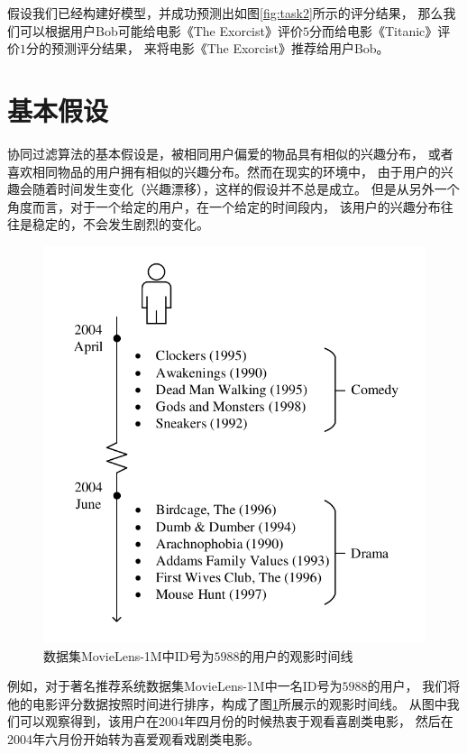 假设我们已经构建好模型，并成功预测出如图\ref{fig:task2}所示的评分结果，
那么我们可以根据用户Bob可能给电影《The Exorcist》评价$5$分而给电影《Titanic》评价$1$分的预测评分结果，
来将电影《The Exorcist》推荐给用户Bob。

\section{基本假设}
协同过滤算法的基本假设是，被相同用户偏爱的物品具有相似的兴趣分布，
或者喜欢相同物品的用户拥有相似的兴趣分布。然而在现实的环境中，
由于用户的兴趣会随着时间发生变化（兴趣漂移），这样的假设并不总是成立。
但是从另外一个角度而言，对于一个给定的用户，在一个给定的时间段内，
该用户的兴趣分布往往是稳定的，不会发生剧烈的变化。

\begin{figure}[htbp]
\centering
\includegraphics[scale=0.75]{images/example.pdf}
\caption{数据集MovieLens-1M中ID号为$5988$的用户的观影时间线}
\label{fig:example}
\end{figure}

例如，对于著名推荐系统数据集MovieLens-1M中一名ID号为$5988$的用户，
我们将他的电影评分数据按照时间进行排序，构成了图\ref{fig:example}所展示的观影时间线。
从图中我们可以观察得到，该用户在2004年四月份的时候热衷于观看喜剧类电影，
然后在2004年六月份开始转为喜爱观看戏剧类电影。

